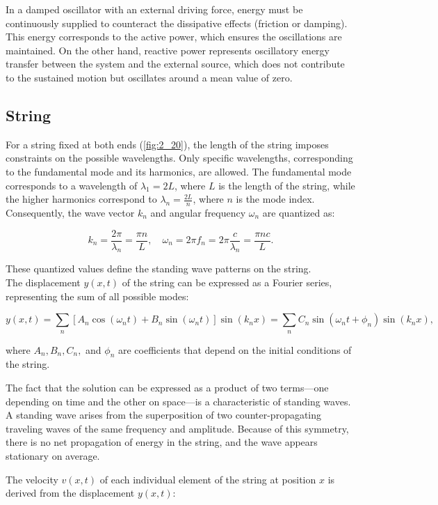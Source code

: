 \documentclass[a4paper]{article}
\begin{document}
In a damped oscillator with an external driving force, energy must be continuously supplied to counteract the dissipative effects (friction or damping). This energy corresponds to the active power, which ensures the oscillations are maintained. On the other hand, reactive power represents oscillatory energy transfer between the system and the external source, which does not contribute to the sustained motion but oscillates around a mean value of zero.

\subsection{String}

For a string fixed at both ends (\ref{fig:2_20}), the length of the string imposes constraints on the possible wavelengths. Only specific wavelengths, corresponding to the fundamental mode and its harmonics, are allowed. The fundamental mode corresponds to a wavelength of \( \lambda_1 = 2L \), where \( L \) is the length of the string, while the higher harmonics correspond to \( \lambda_n = \frac{2L}{n} \), where \( n \) is the mode index. Consequently, the wave vector \( k_n \) and angular frequency \( \omega_n \) are quantized as:

\[
k_n = \frac{2\pi}{\lambda_n} = \frac{\pi n}{L}, \quad \omega_n = 2\pi f_n = 2\pi \frac{c}{\lambda_n} = \frac{\pi n c}{L}.
\]

These quantized values define the standing wave patterns on the string.\\ The displacement \( y(x,t) \) of the string can be expressed as a Fourier series, representing the sum of all possible modes:

\[
y(x, t) = \sum_{n} \left[A_n \cos(\omega_n t) + B_n \sin(\omega_n t)\right] \sin(k_n x) = \sum_{n} C_n \sin(\omega_n t + \phi_n) \sin(k_n x),
\]

where \( A_n, B_n, C_n, \) and \( \phi_n \) are coefficients that depend on the initial conditions of the string.

The fact that the solution can be expressed as a product of two terms—one depending on time and the other on space—is a characteristic of standing waves. A standing wave arises from the superposition of two counter-propagating traveling waves of the same frequency and amplitude. Because of this symmetry, there is no net propagation of energy in the string, and the wave appears stationary on average.

The velocity \( v(x, t) \) of each individual element of the string at position \( x \) is derived from the displacement \( y(x, t) \):
\end{document}
